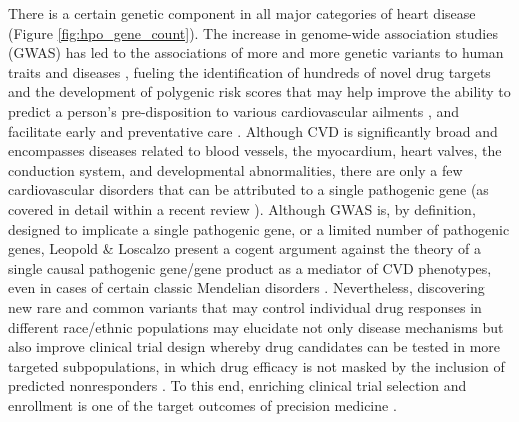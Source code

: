\documentclass[letter]{bib}
\begin{document}
There is a certain genetic component in all major categories of heart disease (Figure \ref{fig:hpo_gene_count}). The increase in genome-wide association studies (GWAS) has led to the associations of more and more genetic variants to human traits and diseases \citep{Visscher:2017:10}, fueling the identification of hundreds of novel drug targets and the development of polygenic risk scores that may help improve the ability to predict a person's pre-disposition to various cardiovascular ailments \citep{Ganna:2013:Multilocus,Goldstein:2014:Simple,Krarup:2015:genetic,Tada:2016:Risk,Abraham:2016:Genomic}, and facilitate early and preventative care \citep{Assimes:2016:Genetic}.  Although CVD is significantly broad and encompasses diseases related to blood vessels, the myocardium, heart valves, the conduction system, and developmental abnormalities, there are only a few cardiovascular disorders that can be attributed to a single pathogenic gene (as covered in detail within a recent review \citep{Leopold:2018:Emerging}).  Although GWAS is, by definition, designed to implicate a single pathogenic gene, or a limited number of pathogenic genes, Leopold \& Loscalzo present a cogent argument against the theory of a single causal pathogenic gene/gene product as a mediator of CVD phenotypes, even in cases of certain classic Mendelian disorders \citep{Leopold:2018:Emerging}.  Nevertheless, discovering new rare and common variants that may control individual drug responses in different race/ethnic populations may elucidate not only disease mechanisms but also improve clinical trial design whereby drug candidates can be tested in more targeted subpopulations, in which drug efficacy is not masked by the inclusion of predicted nonresponders \citep{Lau:2018:Omics}.  To this end, enriching clinical trial selection and enrollment is one of the target outcomes of precision medicine \citep{Leopold:2018:Emerging}.  
\end{document}
